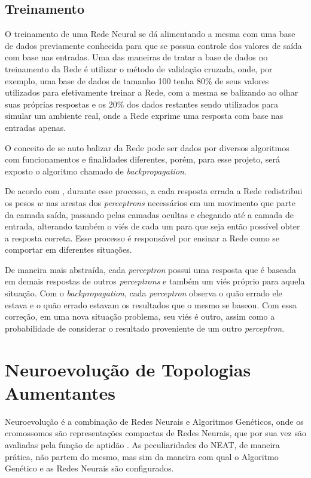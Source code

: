 \subsection{Treinamento}

O treinamento de uma Rede Neural se dá alimentando a mesma com uma 
base de dados previamente conhecida para que se possua controle dos valores de 
saída com base nas entradas. Uma das maneiras de tratar a base de dados no 
treinamento da Rede é utilizar o método de validação cruzada, onde, por exemplo,
uma base de dados de tamanho 100 tenha 80\% de seus valores utilizados para 
efetivamente treinar a Rede, com a mesma se balizando ao olhar suas próprias 
respostas e os 20\% dos dados restantes sendo utilizados para simular um ambiente 
real, onde a Rede exprime uma resposta com base nas entradas apenas. 

O conceito de se auto balizar da Rede pode ser dados por diversos 
algoritmos com funcionamentos e finalidades diferentes, porém, para esse projeto, 
será exposto o algoritmo chamado de \textit{backpropagation}. 

De acordo com , durante esse processo, a cada resposta errada 
a Rede redistribui os pesos \(w\) nas arestas dos \textit{perceptrons} necessários em um 
movimento que parte da camada saída, passando pelas camadas ocultas e 
chegando até a camada de entrada, alterando também o viés de cada um para que 
seja então possível obter a resposta correta. Esse processo é responsável por ensinar a 
Rede como se comportar em diferentes situações.

De maneira mais abstraída, cada \textit{perceptron} possui uma resposta que é 
baseada em demais respostas de outros \textit{perceptrons} e também um viés próprio 
para aquela situação. Com o \textit{backpropagation}, cada \textit{perceptron} observa o quão 
errado ele estava e o quão errado estavam os resultados que o mesmo se baseou. 
Com essa correção, em uma nova situação problema,  seu viés é outro, assim como 
a probabilidade de considerar o resultado proveniente de um outro \textit{perceptron}.

\section{Neuroevolu{\c c}{\~a}o de Topologias Aumentantes}

Neuroevolução é a combinação de Redes Neurais e Algoritmos Genéticos, 
onde os cromossomos são representações compactas de Redes Neurais, que por 
sua vez são avaliadas pela função de aptidão \cite{stanley2004neat}. As peculiaridades 
do NEAT, de maneira prática, não partem do mesmo, mas sim da maneira com qual 
o Algoritmo Genético e as Redes Neurais são configurados. 	

